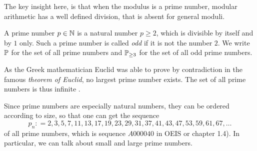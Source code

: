 The key insight here, is that when the modulus is a prime number, modular arithmetic has a well defined division, that is absent for general moduli.

A prime number $ p \in \mathbb{N} $ is a natural number $ p \geq 2 $, which is divisible by itself and by $ 1 $ only. Such a prime number is called \textit{odd} if it is not the number $ 2 $. We write $ \mathbb{P} $ for the set of all prime numbers and $ \mathbb{P} _{\geq 3} $ for the set of all odd prime numbers.

As the Greek mathematician Euclid was able to prove by contradiction in the famous \textit{theorem of Euclid}, no largest prime number exists. The set of all prime numbers is thus infinite \cite{AL}.

Since prime numbers are especially natural numbers, they can be ordered according to size, so that one can get the sequence
\begin{equation}
\label{eq: primenumber_sequence}
p_n: = 2, 3, 5, 7, 11, 13, 17, 19, 23, 29, 31, 37, 41, 43, 47, 53, 59, 61, 67, \ldots
\end{equation}
of all prime numbers, which is sequence $ A000040 $ in OEIS or \cite{HW} chapter 1.4). In particular, we can talk about small and large prime numbers.

